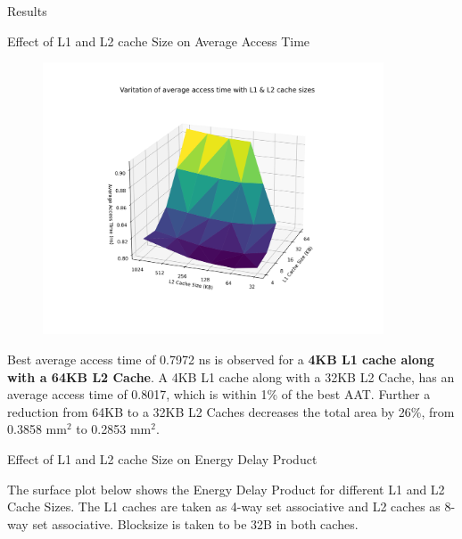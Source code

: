 \begin{section}{Results}
\begin{subsection}{Effect of L1 and L2 cache Size on Average Access Time}
    \begin{figure}[h!]
        \includegraphics[width=0.9\textwidth]{figures/fig5/fig5.png}
        \centering
        \label{fig:fig5}
    \end{figure}

    Best average access time of 0.7972 ns is observed for a \textbf{4KB L1 cache along with a 64KB L2 Cache}. A 4KB L1 cache along with a 32KB L2 Cache, has an average access time of 0.8017, which is within 1\% of the best AAT. Further a reduction from 64KB to a 32KB L2 Caches decreases the total area by 26\%, from 0.3858 $\text{mm}^2$ to 0.2853 $\text{mm}^2$.
    
    \end{subsection}

   
    \begin{subsection}{Effect of L1 and L2 cache Size on Energy Delay Product}

        The surface plot below shows the Energy Delay Product for different L1 and L2 Cache Sizes. The L1 caches are taken as 4-way set associative and L2 caches as 8-way set associative. Blocksize is taken to be 32B in both caches.
    

\end{subsection}
\end{section}
